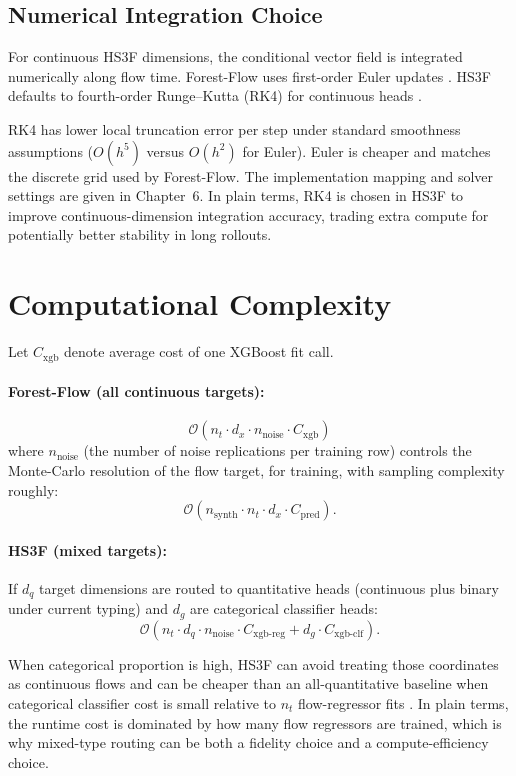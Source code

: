 \subsection{Numerical Integration Choice}

For continuous HS3F dimensions, the conditional vector field is integrated numerically along flow time. Forest-Flow uses first-order Euler updates \cite{jolicoeur2023forest}. HS3F defaults to fourth-order Runge--Kutta (RK4) for continuous heads \cite{akazan2024hs3f}.

RK4 has lower local truncation error per step under standard smoothness assumptions ($O(h^5)$ versus $O(h^2)$ for Euler). Euler is cheaper and matches the discrete grid used by Forest-Flow. The implementation mapping and solver settings are given in Chapter~6.
In plain terms, RK4 is chosen in HS3F to improve continuous-dimension integration accuracy, trading extra compute for potentially better stability in long rollouts.

\section{Computational Complexity}

Let $C_{\text{xgb}}$ denote average cost of one XGBoost fit call.

\paragraph{Forest-Flow (all continuous targets):}
\begin{equation}
\mathcal{O}(n_t \cdot d_x \cdot n_{\text{noise}} \cdot C_{\text{xgb}})
\end{equation}
where $n_{\text{noise}}$ (the number of noise replications per training row) controls the Monte-Carlo resolution of the flow target, for training, with sampling complexity roughly:
\begin{equation}
\mathcal{O}(n_{\text{synth}} \cdot n_t \cdot d_x \cdot C_{\text{pred}}).
\end{equation}

\paragraph{HS3F (mixed targets):}
If $d_q$ target dimensions are routed to quantitative heads (continuous plus binary under current typing) and $d_g$ are categorical classifier heads:
\begin{equation}
\mathcal{O}(n_t \cdot d_q \cdot n_{\text{noise}} \cdot C_{\text{xgb-reg}}
+ d_g \cdot C_{\text{xgb-clf}}).
\end{equation}

When categorical proportion is high, HS3F can avoid treating those coordinates as continuous flows and can be cheaper than an all-quantitative baseline when categorical classifier cost is small relative to $n_t$ flow-regressor fits \cite{akazan2024hs3f}.
In plain terms, the runtime cost is dominated by how many flow regressors are trained, which is why mixed-type routing can be both a fidelity choice and a compute-efficiency choice.
